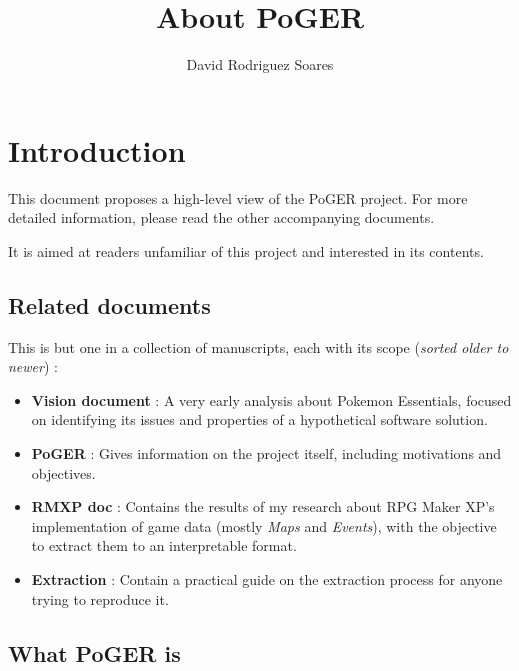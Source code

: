 \documentclass[11pt]{article}
\title{About PoGER}
\author{David Rodriguez Soares}
\begin{document}
\maketitle

\vspace*{\fill}

\begingroup
\hypersetup{linkcolor=black}
\tableofcontents
\endgroup

\vspace{20mm}

\newpage
\section{Introduction}

This document proposes a high-level view of the PoGER project. For more detailed information, please read the other accompanying documents.

It is aimed at readers unfamiliar of this project and interested in its contents.

\subsection{Related documents}

This is but one in a collection of manuscripts, each with its scope (\textit{sorted older to newer}) :

\begin{itemize}
	
	\item \textbf{Vision document} : A very early analysis about Pokemon Essentials, focused on identifying its issues and properties of a hypothetical software solution.
	
	\item \textbf{PoGER} : Gives information on the project itself, including motivations and objectives.
	
	\item \textbf{RMXP doc} : Contains the results of my research about RPG Maker XP's implementation of game data (mostly \textit{Maps} and \textit{Events}), with the objective to extract them to an interpretable format.
	
	\item \textbf{Extraction} : Contain a practical guide on the extraction process for anyone trying to reproduce it.
\end{itemize}



\subsection{What PoGER is}
\end{document}
